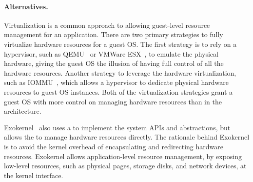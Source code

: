 \paragraph{Alternatives.}
Virtualization is a common approach to allowing guest-level resource management for an application.
There are two primary strategies to fully virtualize hardware resources for a guest OS.
The first strategy is to rely on a hypervisor,
such as QEMU~\cite{qemu} or VMWare ESX~\cite{wldspurger02vmware-esx},
to emulate the physical hardware,
giving the guest OS the illusion of having full control of all the hardware resources.
Another strategy to leverage the hardware virtualization,
such as IOMMU~\cite{VT-d},
which allows a hypervisor to dedicate physical hardware resources
to guest OS instances.
Both of the virtualization strategies grant a guest OS with more control on managing hardware resources than \thelibos{} in the \graphene{} architecture.




Exokernel~\cite{engler95exokernel} also uses a \libos{}
to implement the system APIs and abstractions, but allows the \libos{} to manage hardware resources directly.
The rationale behind Exokernel is to avoid the kernel overhead of encapsulating and redirecting hardware resources.
Exokernel allows application-level resource management, by exposing low-level resources, such as physical pages, storage disks, and network devices, at the kernel interface.



















